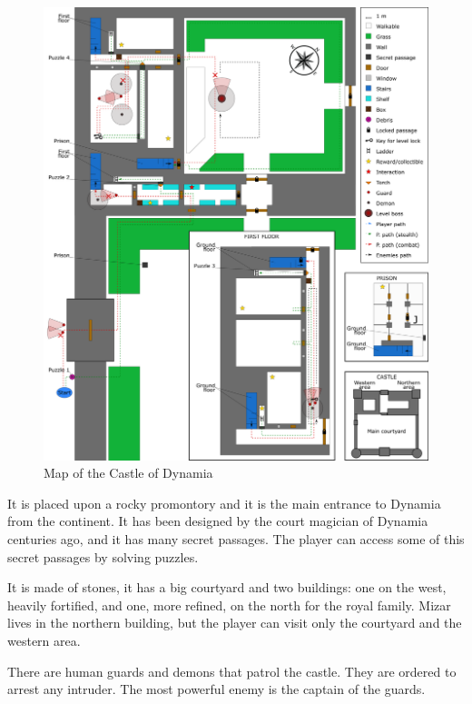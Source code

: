\begin{center}
  \begin{figure}[H]
    \centering
    \includegraphics[width=\textwidth]{Images/Maps/castleOfDynamia}
    \caption{Map of the Castle of Dynamia}
  \end{figure}
\end{center}

It is placed upon a rocky promontory and it is the main entrance to Dynamia from the continent. It has been designed by the court magician of Dynamia centuries ago, and it has many secret passages. The player can access some of this secret passages by solving puzzles.

It is made of stones, it has a big courtyard and two buildings: one on the west, heavily fortified, and one, more refined, on the north for the royal family. Mizar lives in the northern building, but the player can visit only the courtyard and the western area.

There are human guards and demons that patrol the castle. They are ordered to arrest any intruder. The most powerful enemy is the captain of the guards.

